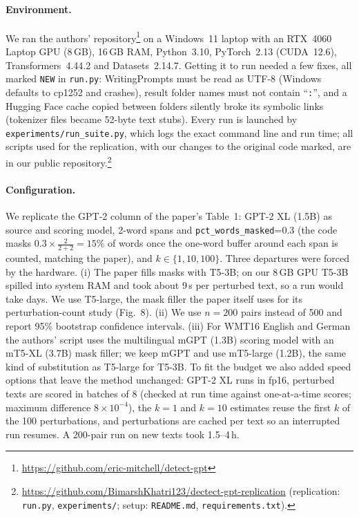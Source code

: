 \documentclass[11pt]{article}
\begin{document}
\paragraph{Environment.} We ran the authors' repository\footnote{\url{https://github.com/eric-mitchell/detect-gpt}} on a Windows~11 laptop with an RTX~4060 Laptop GPU (8\,GB), 16\,GB RAM, Python~3.10, PyTorch~2.13 (CUDA~12.6), Transformers~4.44.2 and Datasets~2.14.7. Getting it to run needed a few fixes, all marked \texttt{NEW} in \texttt{run.py}: WritingPrompts must be read as UTF-8 (Windows defaults to cp1252 and crashes), result folder names must not contain ``\texttt{:}'', and a Hugging Face cache copied between folders silently broke its symbolic links (tokenizer files became 52-byte text stubs). Every run is launched by \texttt{experiments/run\_suite.py}, which logs the exact command line and run time; all scripts used for the replication, with our changes to the original code marked, are in our public repository.\footnote{\url{https://github.com/BimarshKhatri123/dectect-gpt-replication} (replication: \texttt{run.py}, \texttt{experiments/}; setup: \texttt{README.md}, \texttt{requirements.txt}).}

\paragraph{Configuration.} We replicate the GPT-2 column of the paper's Table~1: GPT-2 XL (1.5B) as source and scoring model, 2-word spans and \texttt{pct\_words\_masked}=0.3 (the code masks $0.3\times\frac{2}{2+2}=15\%$ of words once the one-word buffer around each span is counted, matching the paper), and $k\in\{1,10,100\}$. Three departures were forced by the hardware. (i) The paper fills masks with T5-3B; on our 8\,GB GPU T5-3B spilled into system RAM and took about 9\,s per perturbed text, so a run would take days. We use T5-large, the mask filler the paper itself uses for its perturbation-count study (Fig.~8). (ii) We use $n=200$ pairs instead of 500 and report 95\% bootstrap confidence intervals. (iii) For WMT16 English and German the authors' script uses the multilingual mGPT (1.3B) scoring model with an mT5-XL (3.7B) mask filler; we keep mGPT and use mT5-large (1.2B), the same kind of substitution as T5-large for T5-3B. To fit the budget we also added speed options that leave the method unchanged: GPT-2 XL runs in fp16, perturbed texts are scored in batches of 8 (checked at run time against one-at-a-time scores; maximum difference $8\times10^{-4}$), the $k=1$ and $k=10$ estimates reuse the first $k$ of the 100 perturbations, and perturbations are cached per text so an interrupted run resumes. A 200-pair run on new texts took 1.5--4\,h.
\end{document}

